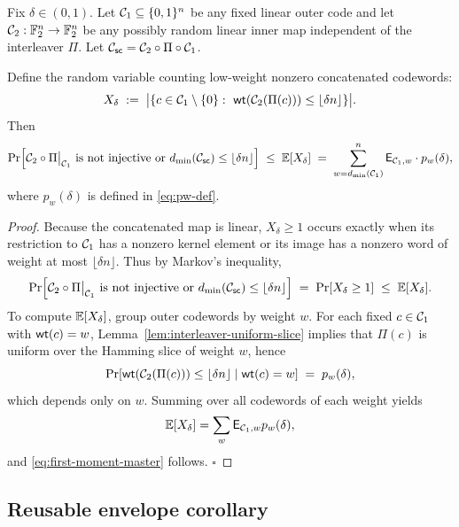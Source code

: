 \begin{theorem}
\label{thm:sc-framework}
Fix \(\delta\in(0,1)\). Let \({\mathcal{C}_1}\subseteq\{0,1\}^n\) be any fixed linear
outer code and let \({\mathcal{C}_2}:\mathbb{F}_2^n\to\mathbb{F}_2^n\) be any possibly random linear
inner map independent of the interleaver \(\Pi\).
Let \({\mathcal{C}_{\mathsf{sc}}}={\mathcal{C}_2}\circ\Pi\circ{\mathcal{C}_1}\).

Define the random variable counting low-weight nonzero concatenated codewords:
\[
X_\delta
\;:=\;
\bigl|\{c\in{\mathcal{C}_1}\setminus\{0\}:\ \mathsf{wt}({\mathcal{C}_2}(\Pi(c)))\le \lfloor\delta n\rfloor\}\bigr|.
\]
Then
\begin{equation}
\label{eq:first-moment-master}
\Pr\Bigl[
 {\mathcal{C}_2}\circ\Pi\big|_{{\mathcal{C}_1}}\text{ is not injective}
 \ \text{or}\ d_{\min}({\mathcal{C}_{\mathsf{sc}}})\le \lfloor\delta n\rfloor
\Bigr]
\;\le\;
\mathbb{E}[X_\delta]
\;=\;
\sum_{w=d_{\min}({\mathcal{C}_1})}^{n} \mathsf{E}_{{\mathcal{C}_1},w}\cdot p_w(\delta),
\end{equation}
where \(p_w(\delta)\) is defined in \eqref{eq:pw-def}.
\end{theorem}

\begin{proof}
Because the concatenated map is linear, \(X_\delta\ge1\) occurs exactly when
its restriction to \({\mathcal{C}_1}\) has a nonzero kernel element or its image has a
nonzero word of weight at most \(\lfloor\delta n\rfloor\).  Thus by Markov's
inequality,
\[
\Pr\Bigl[
 {\mathcal{C}_2}\circ\Pi\big|_{{\mathcal{C}_1}}\text{ is not injective}
 \ \text{or}\ d_{\min}({\mathcal{C}_{\mathsf{sc}}})\le \lfloor\delta n\rfloor
\Bigr]
\;=\;
\Pr[X_\delta\ge 1]
\;\le\;
\mathbb{E}[X_\delta].
\]
To compute \(\mathbb{E}[X_\delta]\), group outer codewords by weight \(w\).
For each fixed \(c\in{\mathcal{C}_1}\) with \(\mathsf{wt}(c)=w\), Lemma~\ref{lem:interleaver-uniform-slice} implies that \(\Pi(c)\)
is uniform over the Hamming slice of weight \(w\), hence
\[
\Pr[\mathsf{wt}({\mathcal{C}_2}(\Pi(c)))\le \lfloor\delta n\rfloor \mid \mathsf{wt}(c)=w]
\;=\; p_w(\delta),
\]
which depends only on \(w\). Summing over all codewords of each weight yields
\[
\mathbb{E}[X_\delta]=\sum_w \mathsf{E}_{{\mathcal{C}_1},w}p_w(\delta),
\]
and \eqref{eq:first-moment-master} follows. \(\square\)
\end{proof}

\subsection{Reusable envelope corollary}
\label{sec:framework-corollary}

